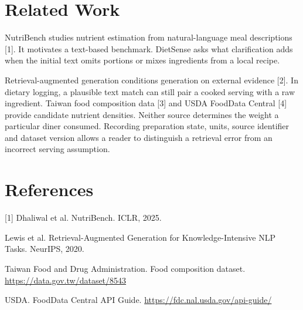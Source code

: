 \documentclass[11pt]{article}
\begin{document}
\section{Related Work}
NutriBench studies nutrient estimation from natural-language meal descriptions [1]. It motivates a text-based benchmark. DietSense asks what clarification adds when the initial text omits portions or mixes ingredients from a local recipe.

Retrieval-augmented generation conditions generation on external evidence [2]. In dietary logging, a plausible text match can still pair a cooked serving with a raw ingredient. Taiwan food composition data [3] and USDA FoodData Central [4] provide candidate nutrient densities. Neither source determines the weight a particular diner consumed. Recording preparation state, units, source identifier and dataset version allows a reader to distinguish a retrieval error from an incorrect serving assumption.
\section*{References}
\small
[1] Dhaliwal et al. NutriBench. ICLR, 2025. \par
[2] Lewis et al. Retrieval-Augmented Generation for Knowledge-Intensive NLP Tasks. NeurIPS, 2020. \par
[3] Taiwan Food and Drug Administration. Food composition dataset. \url{https://data.gov.tw/dataset/8543}\par
[4] USDA. FoodData Central API Guide. \url{https://fdc.nal.usda.gov/api-guide/}
\end{document}
